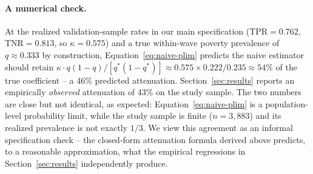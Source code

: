 \documentclass[12pt]{article}
\begin{document}
\paragraph{A numerical check.} At the realized validation-sample rates in our main specification (TPR$=0.762$, TNR$=0.813$, so $\kappa=0.575$) and a true within-wave poverty prevalence of $q\approx0.333$ by construction, Equation~\ref{eq:naive-plim} predicts the naive estimator should retain $\kappa \cdot q(1-q)/[q^{*}(1-q^{*})] \approx 0.575 \times 0.222/0.235 \approx 54\%$ of the true coefficient -- a 46\% predicted attenuation. Section~\ref{sec:results} reports an empirically \emph{observed} attenuation of 43\% on the study sample. The two numbers are close but not identical, as expected: Equation~\ref{eq:naive-plim} is a population-level probability limit, while the study sample is finite ($n=3{,}883$) and its realized prevalence is not exactly $1/3$. We view this agreement as an informal specification check -- the closed-form attenuation formula derived above predicts, to a reasonable approximation, what the empirical regressions in Section~\ref{sec:results} independently produce.
\end{document}

